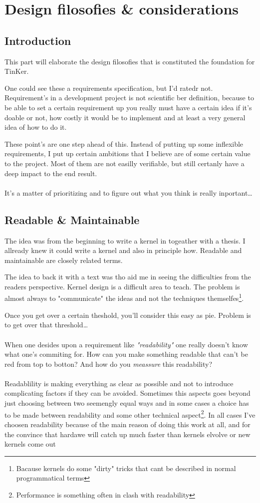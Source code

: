 \part{Design filosofies \& considerations}
\chapter{Introduction}
This part will elaborate the design filosofies that is constituted the foundation for TinKer.

One could see these a requirements specification, but I'd ratedr not. Requirement's in a development project is not scientific ber definition, because to be able to set a certain requirement up you really must have a certain idea if it's doable or not, how costly it would be to implement and at least a very general idea of how to do it.

These point's are one step ahead of this. Instead of putting up some inflexible requirements, I put up certain ambitions that I believe are of some certain value to the project. Most of them are not easilly verifiable, but still certanly have a deep impact to the end result.
\\\\
It's a matter of prioritizing and to figure out what you think is really inportant\ldots

\chapter{Readable \& Maintainable}
The idea was from the beginning to write a kernel in togeather with a thesis. I allready knew it could write a kernel and also in principle how. Readable and maintainable are closely related terms. 

The idea to back it with a text was tho aid me in seeing the difficulties from the readers perspective. Kernel design is a difficult area to teach. The problem is almost always to "communicate" the ideas and not the techniques themselfes\footnote{Bacause kernels do some "dirty" tricks that cant be described in normal programmatical terms}. 

Once you get over a certain theshold, you'll consider this easy as pie. Problem is to get over that threshold\ldots
\\\\
When one desides upon a requirement like \textit{"readability"} one really doesn't know what one's commiting for. How can you make something readable that can't be red from top to botton? And how do you \textit{meassure} this readability?
\\\\
Readablility is making everything as clear as possible and not to introduce complicating factors if they can be avoided. Sometimes this aspects goes beyond just choosing between two seemengly equal ways and in some cases a choice has to be made between readability and some other technical aspect\footnote{Performance is something often in clash with readability}. In all cases I've choosen readability because of the main reason of doing this work at all, and for the convince that hardawe will catch up much faster than kernels elvolve or new kernels come out 

